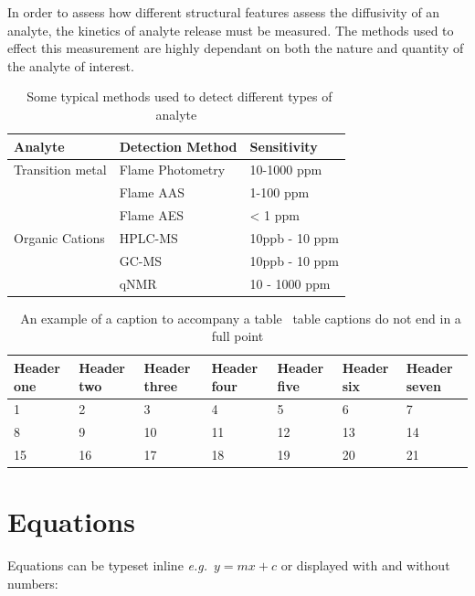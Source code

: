 \documentclass[twoside,twocolumn,9pt]{article}
\begin{document}
In order to assess how different structural features assess the diffusivity of an analyte, the kinetics of analyte release must be measured. The methods used to effect this measurement are highly dependant on both the nature and quantity of the analyte of interest. 

\begin{table}[h]
\small
  \caption{\ Some typical methods used to detect different types of analyte}
  \label{tbl:example}
  \begin{tabular*}{0.48\textwidth}{@{\extracolsep{\fill}}lll}
    \hline
    Analyte & Detection Method & Sensitivity \\
    \hline
    Transition metal & Flame Photometry & 10-1000 ppm\\
                     & Flame AAS        & 1-100 ppm\\
                     & Flame AES        & < 1 ppm \\
    Organic Cations  & HPLC-MS          & 10ppb - 10 ppm\\
                     & GC-MS            & 10ppb - 10 ppm\\
                     & qNMR             & 10 - 1000 ppm\\
                     \hline
  \end{tabular*}
\end{table}




\begin{table}
\small
  \caption{\ An example of a caption to accompany a table \textendash\ table captions do not end in a full point}
  \label{tbl:example}
  \begin{tabular*}{\textwidth}{@{\extracolsep{\fill}}lllllll}
    \hline
    Header one & Header two & Header three & Header four & Header five & Header six  & Header seven\\
    \hline
    1 & 2 & 3 & 4 & 5 & 6  & 7\\
    8 & 9 & 10 & 11 & 12 & 13 & 14 \\
    15 & 16 & 17 & 18 & 19 & 20 & 21\\
    \hline
  \end{tabular*}
\end{table}

\section{Equations}

Equations can be typeset inline \textit{e.g.}\ $ y = mx + c$ or displayed with and without numbers:
\end{document}
